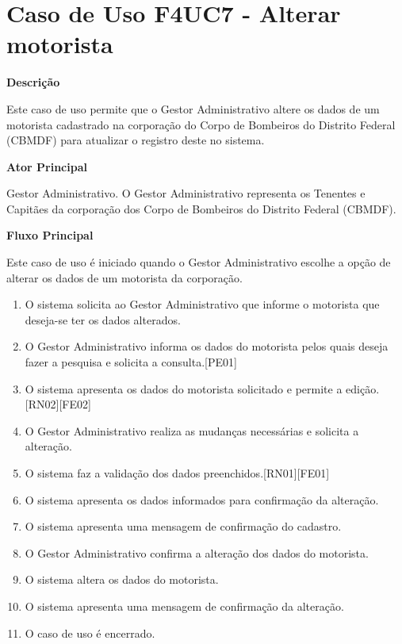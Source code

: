 
  \section{Caso de Uso F4UC7 - Alterar motorista}

  {\raggedright
      \textbf{Descrição}
  }

    Este caso de uso permite que o Gestor Administrativo altere os dados de um motorista cadastrado na corporação do Corpo de Bombeiros
    do Distrito Federal (CBMDF) para atualizar o registro deste no sistema.
    
  {\raggedright
      \textbf{Ator Principal}
  }

    Gestor Administrativo. O Gestor Administrativo representa os Tenentes e Capitães da corporação dos Corpo de Bombeiros do Distrito
    Federal (CBMDF).

  {\raggedright
      \textbf{Fluxo Principal}
  }
  
    Este caso de uso é iniciado quando o Gestor Administrativo escolhe a opção de alterar os dados de um motorista da corporação.
    
  
  \begin{enumerate}
    \item O sistema solicita ao Gestor Administrativo que informe o motorista que deseja-se ter os dados alterados.
    \item O Gestor Administrativo  informa os dados do motorista pelos quais deseja fazer a pesquisa e solicita a consulta.[PE01]
    \item O sistema apresenta os dados do motorista solicitado e permite a edição.[RN02][FE02]
    \item O Gestor Administrativo realiza as mudanças necessárias e solicita a alteração.
    \item O sistema faz a validação dos dados preenchidos.[RN01][FE01]
    \item O sistema apresenta os dados informados para confirmação da alteração.
    \item O sistema apresenta uma mensagem de confirmação do cadastro.
    \item O Gestor Administrativo confirma a alteração dos dados do motorista.
    \item O sistema altera os dados do motorista.
    \item O sistema apresenta uma mensagem de confirmação da alteração.
    \item O caso de uso é encerrado.
    
  \end{enumerate}
  
